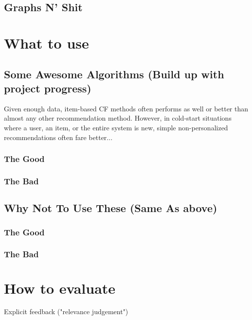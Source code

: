 \subsection{Graphs N' Shit}


\section{What to use}


%
\subsection{Some Awesome Algorithms (Build up with project progress)}

Given enough data, item-based CF methods often performs as well or better than almost any other recommendation method. However, in cold-start situations where a user, an item, or the entire system is new, simple non-personalized recommendations often fare better...

\subsubsection{The Good}
\subsubsection{The Bad}
\subsection{Why Not To Use These (Same As above)}
\subsubsection{The Good}
\subsubsection{The Bad}

\section{How to evaluate}

Explicit feedback ("relevance judgement")

